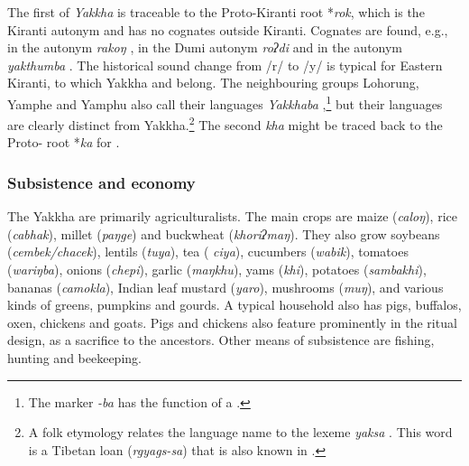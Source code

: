 The first  of  \emph{Yakkha} is traceable to the Proto-Kiranti root *\emph{rok}, which is the Kiranti autonym and has no cognates outside Kiranti. Cognates are found, e.g., in the  autonym \emph{rakoŋ} \citep{Bickeletal2009Puma}, in the Dumi autonym \emph{roʔdi} \citep[413]{Driem1993A-grammar} and in the  autonym \emph{yakthumba} \citep[xix]{Driem1987A-grammar}.  The historical sound change from  /r/ to /y/ is typical for Eastern Kiranti, to which Yakkha and  belong. The neighbouring groups Lohorung, Yamphe and Yamphu  also call their languages \emph{Yakkhaba} \citep[347]{Driem1994The-Yakkha},\footnote{The marker \emph{-ba} has the function of a .}  but their languages are clearly distinct from Yakkha.\footnote{A folk etymology relates the language name to the  lexeme \emph{yaksa}  \citep[87]{Kongren2007Indigenous}. This word is a Tibetan loan (\emph{rgyags-sa})  that is also known in  \citep{Turner1931A-Comparative}.} The second  \emph{kha} might be traced back to the Proto- root  *\emph{ka} for  \citep[174]{Matisoff2003Handbook}.

   
\subsubsection{Subsistence and economy}
 
The Yakkha are primarily agriculturalists. The main crops are maize (\emph{caloŋ}), rice (\emph{cabhak}), millet (\emph{paŋge}) and  buckwheat (\emph{khoriʔmaŋ}). They also grow soybeans (\emph{cembek/chacek}), lentils (\emph{tuya}), tea ( \emph{ciya}), cucumbers (\emph{wabik}), tomatoes (\emph{wa\-riŋba}), onions (\emph{chepi}), garlic (\emph{maŋkhu}), yams (\emph{khi}), potatoes (\emph{sambakhi}), bananas (\emph{camokla}), Indian leaf mustard (\emph{yaro}), mushrooms (\emph{muŋ}), and various kinds of greens, pumpkins and gourds. A typical household also has pigs, buffalos, oxen, chickens and goats. Pigs and chickens also feature prominently in the ritual design, as a sacrifice to the ancestors. Other means of subsistence are fishing, hunting  and beekeeping.  

